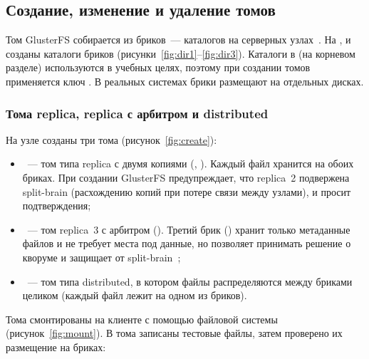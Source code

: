 \subsection{Создание, изменение и удаление томов}

Том GlusterFS собирается из бриков~--- каталогов на серверных узлах~\cite{gluster-volumes}. На ,  и  созданы каталоги бриков (рисунки~\ref{fig:dir1}--\ref{fig:dir3}). Каталоги в  (на корневом разделе) используются в учебных целях, поэтому при создании томов применяется ключ . В реальных системах брики размещают на отдельных дисках.


\subsubsection{Тома replica, replica с арбитром и distributed}

На узле  созданы три тома (рисунок~\ref{fig:create}):
\begin{itemize}
  \item {}~--- том типа replica с двумя копиями (, ). Каждый файл хранится на обоих бриках. При создании GlusterFS предупреждает, что replica~2 подвержена split-brain (расхождению копий при потере связи между узлами), и просит подтверждения;
  \item {}~--- том replica~3 с арбитром (). Третий брик () хранит только метаданные файлов и не требует места под данные, но позволяет принимать решение о кворуме и защищает от split-brain~\cite{gluster-arbiter};
  \item {}~--- том типа distributed, в котором файлы распределяются между бриками целиком (каждый файл лежит на одном из бриков).
\end{itemize}


Тома смонтированы на клиенте с помощью файловой системы  (рисунок~\ref{fig:mount}). В тома записаны тестовые файлы, затем проверено их размещение на бриках:

